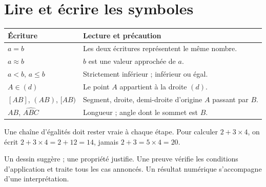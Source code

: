 \documentclass[../cours_3e.tex]{subfiles}
\begin{document}
\section{Lire et écrire les symboles}
\begin{center}
\begin{tabularx}{\textwidth}{lX}
\toprule
Écriture & Lecture et précaution\\\midrule
$a=b$ & Les deux écritures représentent le même nombre.\\
$a\approx b$ & $b$ est une valeur approchée de $a$.\\
$a<b$, $a\leq b$ & Strictement inférieur ; inférieur ou égal.\\
$A\in(d)$ & Le point $A$ appartient à la droite $(d)$.\\
$[AB]$, $(AB)$, $[AB)$ & Segment, droite, demi-droite d'origine $A$ passant par $B$.\\
$AB$, $\widehat{ABC}$ & Longueur ; angle dont le sommet est $B$.\\
\bottomrule
\end{tabularx}
\end{center}
Une chaîne d'égalités doit rester vraie à chaque étape. Pour calculer $2+3\times4$, on écrit $2+3\times4=2+12=14$, jamais $2+3=5\times4=20$.
\begin{retenir}
Un dessin suggère ; une propriété justifie. Une preuve vérifie les conditions d'application et traite tous les cas annoncés. Un résultat numérique s'accompagne d'une interprétation.
\end{retenir}
\end{document}
